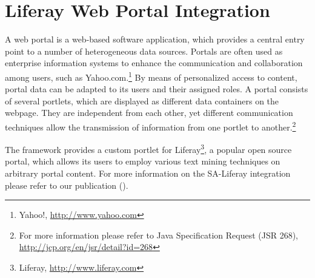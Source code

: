 %
%
%   
% 

\chapter{Liferay Web Portal Integration}
\label{chap:liferay}
A web portal is a web-based software application, which provides a central entry point to a number of heterogeneous data sources. Portals are often used as enterprise information systems to enhance the communication and collaboration among users, such as Yahoo.com.\footnote{Yahoo!, \url{http://www.yahoo.com}} By means of personalized access to content, portal data can be adapted to its users and their assigned roles. A portal consists of several portlets, which are displayed as different data containers on the webpage. They are independent from each other, yet different communication techniques allow the transmission of information from one portlet to another.\footnote{For more information please refer to Java Specification Request (JSR 268), \url{http://jcp.org/en/jsr/detail?id=268}}

The \sa framework provides a custom portlet for Liferay\footnote{Liferay, \url{http://www.liferay.com}}, a popular open source portal, which allows its users to employ various text mining techniques on arbitrary portal content. For more information on the SA-Liferay integration please refer to our publication (\cite{LoefflerEtAl:CSWS2013}).

